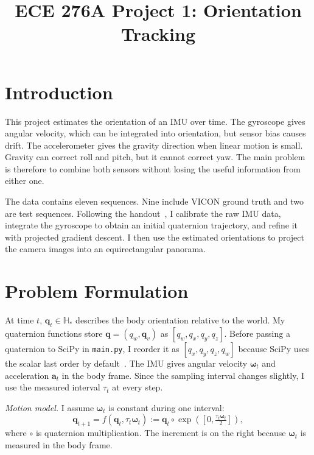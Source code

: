 \documentclass[letterpaper, 10pt, conference]{ieeeconf}
\newcommand{\q}{\mathbf{q}}
\newcommand{\w}{\boldsymbol{\omega}}
\newcommand{\Hstar}{\mathbb{H}_*}
\begin{document}
\title{ECE 276A Project 1: Orientation Tracking}

\author{
}

\maketitle
\thispagestyle{empty}
\pagestyle{empty}

\section{Introduction}

This project estimates the orientation of an IMU over time. The gyroscope gives
angular velocity, which can be integrated into orientation, but sensor bias
causes drift. The accelerometer gives the gravity direction when linear motion
is small. Gravity can correct roll and pitch, but it cannot correct yaw. The
main problem is therefore to combine both sensors without losing the useful
information from either one.

The data contains eleven sequences. Nine include VICON ground truth and two are
test sequences. Following the handout~\cite{atanasov}, I calibrate the raw IMU
data, integrate the gyroscope to obtain an initial quaternion trajectory, and
refine it with projected gradient descent. I then use the estimated orientations
to project the camera images into an equirectangular panorama.

\section{Problem Formulation}

At time $t$, $\q_t\in\Hstar$ describes the body orientation relative to the
world. My quaternion functions store $\q=(q_w,\mathbf{q}_v)$ as
$[q_w,q_x,q_y,q_z]$. Before passing a quaternion to SciPy in
\texttt{main.py}, I reorder it as $[q_x,q_y,q_z,q_w]$ because SciPy uses the
scalar last order by default~\cite{scipyquat}. The IMU gives angular velocity
$\w_t$ and acceleration $\mathbf a_t$ in the body frame. Since the sampling
interval changes slightly, I use the measured interval $\tau_t$ at every step.

\emph{Motion model.} I assume $\w_t$ is constant during one interval:
\begin{equation}
\q_{t+1}=f(\q_t,\tau_t\w_t):=\q_t\circ\exp\!\left(\left[0,\tfrac{\tau_t\w_t}{2}\right]\right),
\label{eq:motion}
\end{equation}
where $\circ$ is quaternion multiplication. The increment is on the right
because $\w_t$ is measured in the body frame.
\end{document}
